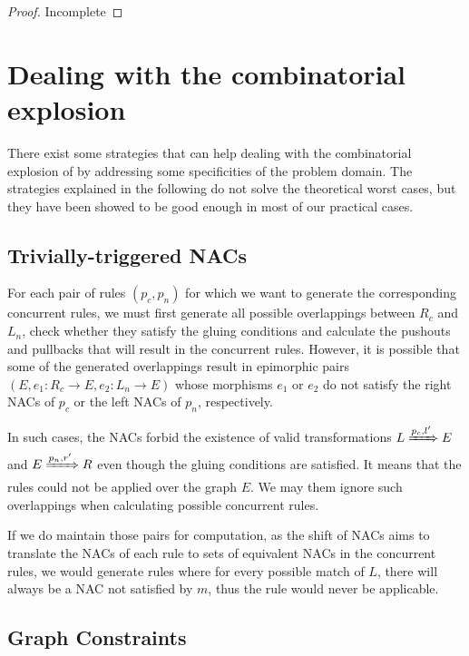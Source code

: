 \begin{thm}[EpiPairs]
  \begin{proof}{Incomplete}
  \end{proof}
\end{thm}

\section{Dealing with the combinatorial explosion}\label{sec:explosion}

There exist some strategies that can help dealing with the combinatorial explosion of by addressing some specificities of the problem domain. The strategies explained in the following do not solve the theoretical worst cases, but they have been showed to be good enough in most of our practical cases.

\subsection{Trivially-triggered NACs}

For each pair of rules $(p_c,p_n)$ for which we want to generate the corresponding concurrent rules, we must first generate all possible overlappings between $R_c$ and $L_n$, check whether they satisfy the gluing conditions and calculate the pushouts and pullbacks that will result in the concurrent rules. However, it is possible that some of the generated overlappings result in epimorphic pairs $(E, e_1 : R_c \rightarrow E, e_2 : L_n \rightarrow E)$ whose morphisms $e_1$ or $e_2$ do not satisfy
the right NACs of $p_c$ or the left NACs of $p_n$, respectively.

In such cases, the NACs forbid the existence of valid transformations \mbox{$L \xRightarrow{p_c,l'} E$} and $E \xRightarrow{p_n,r'} R$ even though the gluing conditions are satisfied. It means that the rules could not be applied over the graph $E$. We may them ignore such overlappings when calculating possible concurrent rules.

If we do maintain those pairs for computation, as the shift of NACs aims to translate the NACs of each rule to sets of equivalent NACs in the concurrent rules, we would generate rules where for every possible match of $L$, there will always be a NAC not satisfied by $m$, thus the rule would never be applicable.

\subsection{Graph Constraints}\label{sec:constraints}

